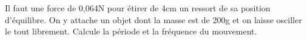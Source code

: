 %
%
    Il faut une force de 0,064N pour étirer de 4cm un ressort de sa position d'équilibre. On y attache un objet dont la masse est de 200g et on laisse osciller le tout librement. Calcule la période et la fréquence du mouvement.
